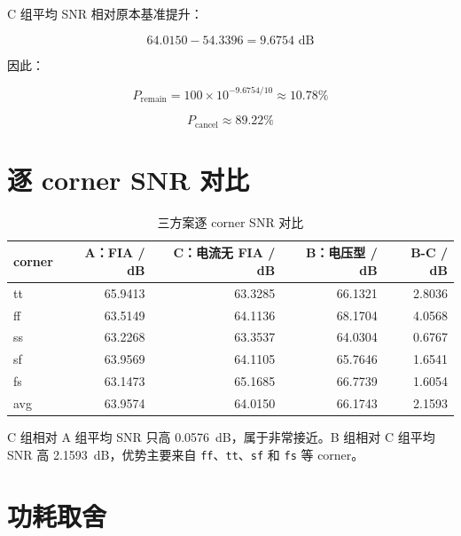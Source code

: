 \documentclass[12pt,a4paper]{ctexart}
\begin{document}
C 组平均 SNR 相对原本基准提升：

\begin{equation}
64.0150 - 54.3396 = 9.6754 \text{ dB}
\end{equation}

因此：

\begin{equation}
P_{\text{remain}} = 100 \times 10^{-9.6754/10} \approx 10.78\%
\end{equation}

\begin{equation}
P_{\text{cancel}} \approx 89.22\%
\end{equation}

\section{逐 corner SNR 对比}

\begin{table}[H]
\centering
\caption{三方案逐 corner SNR 对比}
\begin{tabular}{lrrrr}
\toprule
corner & A：FIA / dB & C：电流无 FIA / dB & B：电压型 / dB & B-C / dB \\
\midrule
tt & 65.9413 & 63.3285 & 66.1321 & 2.8036 \\
ff & 63.5149 & 64.1136 & 68.1704 & 4.0568 \\
ss & 63.2268 & 63.3537 & 64.0304 & 0.6767 \\
sf & 63.9569 & 64.1105 & 65.7646 & 1.6541 \\
fs & 63.1473 & 65.1685 & 66.7739 & 1.6054 \\
avg & 63.9574 & 64.0150 & 66.1743 & 2.1593 \\
\bottomrule
\end{tabular}
\end{table}

C 组相对 A 组平均 SNR 只高 \SI{0.0576}{dB}，属于非常接近。B 组相对 C 组平均 SNR 高 \SI{2.1593}{dB}，优势主要来自 \texttt{ff}、\texttt{tt}、\texttt{sf} 和 \texttt{fs} 等 corner。

\section{功耗取舍}

\begin{table}[H]
\centering
\caption{平均功耗对比}
\end{table}
\end{document}
